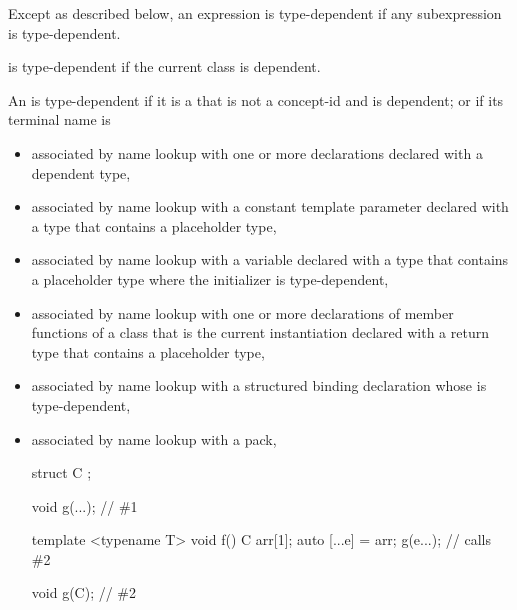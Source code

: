 \pnum
Except as described below, an expression is type-dependent if any
subexpression is type-dependent.

\pnum
{}
is type-dependent if the current class is
dependent.

\pnum
An  is type-dependent
if it is a  that is not a concept-id and is dependent;
or if its terminal name is
\begin{itemize}
\item
associated by name lookup with one or more declarations
declared with a dependent type,
\item
associated by name lookup with
a constant template parameter
declared with a type
that contains a placeholder type,
\item
associated by name lookup with
a variable declared with a type that contains a placeholder type
where the initializer is type-dependent,
\item
associated by name lookup with one or more
declarations of member functions of a class that is the current instantiation
declared with a return type that contains a placeholder type,
\item
associated by name lookup with
a structured binding declaration whose
 is type-dependent,
\item
associated by name lookup with a pack,
\begin{example}
\begin{codeblock}
struct C { };

void g(...);            // \#1

template <typename T>
void f() {
  C arr[1];
  auto [...e] = arr;
  g(e...);              // calls \#2
}

void g(C);              // \#2


\end{codeblock}
\end{example}
\end{itemize}
